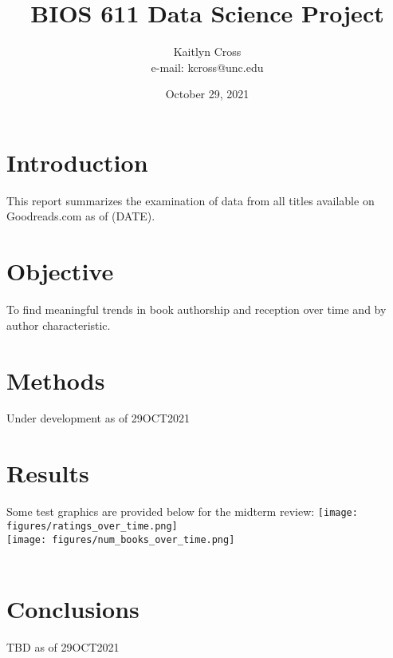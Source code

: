 \documentclass{article}
\begin{document}
\title{BIOS 611 Data Science Project}
\author{Kaitlyn Cross \\ e-mail: kcross@unc.edu}
\date{October 29, 2021}
\maketitle
\section{Introduction}
This report summarizes the examination of data from all titles available on Goodreads.com as of (DATE).
\section{Objective}
To find meaningful trends in book authorship and reception over time and by author characteristic.
\section{Methods}
Under development as of 29OCT2021
\section{Results}
Some test graphics are provided below for the midterm review:
\texttt{[image: figures/ratings\_over\_time.png]}\\
\texttt{[image: figures/num\_books\_over\_time.png]}\\
\\
\section{Conclusions}
TBD as of 29OCT2021
\end{document}
